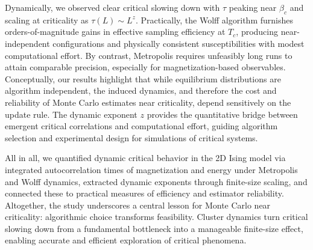 Dynamically, we observed clear critical slowing down with $\tau$ peaking near $\beta_c$ and scaling at criticality as $\tau(L) \sim L^z$. Practically, the Wolff algorithm furnishes orders-of-magnitude gains in effective sampling efficiency at $T_c$, producing near-independent configurations and physically consistent susceptibilities with modest computational effort. By contrast, Metropolis requires unfeasibly long runs to attain comparable precision, especially for magnetization-based observables. Conceptually, our results highlight that while equilibrium distributions are algorithm independent, the induced dynamics, and therefore the cost and reliability of Monte Carlo estimates near criticality, depend sensitively on the update rule.
The dynamic exponent $z$ provides the quantitative bridge between emergent critical correlations and computational effort, guiding algorithm selection and experimental design for simulations of critical systems.

All in all, we quantified dynamic critical behavior in the 2D Ising model via integrated autocorrelation times of magnetization and energy under Metropolis and Wolff dynamics, extracted dynamic exponents through finite-size scaling, and connected these to practical measures of efficiency and estimator reliability.
Altogether, the study underscores a central lesson for Monte Carlo near criticality: algorithmic choice transforms feasibility. Cluster dynamics turn critical slowing down from a fundamental bottleneck into a manageable finite-size effect, enabling accurate and efficient exploration of critical phenomena.